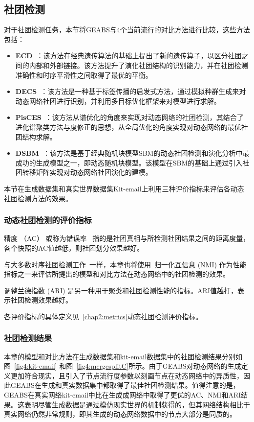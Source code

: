 \subsection{社团检测}
对于社团检测任务，本节将GEABS与$4$个当前流行的对比方法进行比较，这些方法包括：
\begin{itemize}
  \item \textbf{ECD~\cite{liu2019evolutionary}}：该方法在经典遗传算法的基础上提出了新的遗传算子，以区分社团之间的内部和外部链接。该方法提升了演化社团结构的识别能力，并在社团检测准确性和时序平滑性之间取得了最优的平衡。
  \item \textbf{DECS~\cite{liu2020detecting}}：该方法是一种基于标签传播的启发式方法，通过模拟种群生成来对动态网络社团进行识别，并利用多目标优化框架来对模型进行求解。
  \item \textbf{PisCES~\cite{liu2018using}}：该方法从谱优化的角度来实现对动态网络的社团检测，其结合了进化谱聚类方法与度修正的思想，从全局优化的角度实现对动态网络的最优社团结构求解。
  \item \textbf{DSBM~\cite{yang2011detecting}}：该方法是基于经典随机块模型SBM的动态社团检测和演化分析中最成功的生成模型之一，即动态随机块模型。该模型在SBM的基础上通过引入社团转移矩阵实现对动态网络社团演化的建模。
\end{itemize}


本节在生成数据集和真实世界数据集Kit-email上利用三种评价指标来评估各动态社团检测方法的效果。



\subsubsection{动态社团检测的评价指标}
{精度} （AC） 或称为错误率~\cite{lin2009analyzing} 指的是社团真相与所检测社团结果之间的距离度量，各个快照的AC值越低，则社团划分效果越好。

与大多数时序社团检测工作~\cite{hartmann2016clustering}一样，本章也将使用~{归一化互信息} (NMI) 作为性能指标之一来评估所提出的模型和对比方法在动态网络中的社团检测的效果。

{调整兰德指数} (ARI) 是另一种用于聚类和社团检测性能的指标。ARI值越打，表示社团检测效果越好。

各评价指标的具体定义见~\ref{chap2:metrics}动态社团检测评价指标。

\subsubsection{社团检测结果}

本章的模型和对比方法在生成数据集和kit-email数据集中的社团检测结果分别如图~\ref{fig4:kit-email} 和图~\ref{fig4:mergesplitC}所示。由于GEABS对动态网络的生成定义更加符合现实，且引入了节点流行度参数以刻画节点在动态网络中的异质性，因此GEABS在生成和真实数据集中都取得了最佳社团检测结果。值得注意的是，GEABS在真实网络kit-email中比在生成成网络中取得了更优的AC、NMI和ARI结果。这表明尽管生成数据是通过模仿现实世界的机制获得的，但其网络结构相比于真实网络仍然非常规则，即其生成的动态网络数据中的节点大部分是同质的。

